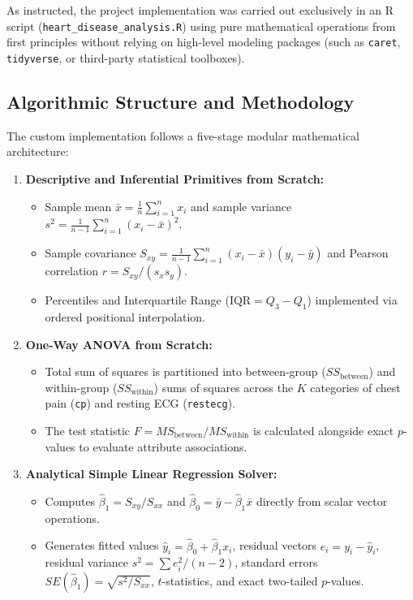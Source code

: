 \documentclass[12pt,a4paper]{article}
\begin{document}
As instructed, the project implementation was carried out exclusively in an R script (\texttt{heart\_disease\_analysis.R}) using pure mathematical operations from first principles without relying on high-level modeling packages (such as \texttt{caret}, \texttt{tidyverse}, or third-party statistical toolboxes).

\subsection{Algorithmic Structure and Methodology}
The custom implementation follows a five-stage modular mathematical architecture:

\begin{enumerate}
    \item \textbf{Descriptive and Inferential Primitives from Scratch:}
    \begin{itemize}
        \item Sample mean $\bar{x} = \frac{1}{n} \sum_{i=1}^n x_i$ and sample variance $s^2 = \frac{1}{n-1} \sum_{i=1}^n (x_i - \bar{x})^2$.
        \item Sample covariance $S_{xy} = \frac{1}{n-1} \sum_{i=1}^n (x_i - \bar{x})(y_i - \bar{y})$ and Pearson correlation $r = S_{xy} / (s_x s_y)$.
        \item Percentiles and Interquartile Range ($\text{IQR} = Q_3 - Q_1$) implemented via ordered positional interpolation.
    \end{itemize}

    \item \textbf{One-Way ANOVA from Scratch:}
    \begin{itemize}
        \item Total sum of squares is partitioned into between-group ($SS_{\text{between}}$) and within-group ($SS_{\text{within}}$) sums of squares across the $K$ categories of chest pain (\texttt{cp}) and resting ECG (\texttt{restecg}).
        \item The test statistic $F = MS_{\text{between}} / MS_{\text{within}}$ is calculated alongside exact $p$-values to evaluate attribute associations.
    \end{itemize}

    \item \textbf{Analytical Simple Linear Regression Solver:}
    \begin{itemize}
        \item Computes $\hat{\beta}_1 = S_{xy}/S_{xx}$ and $\hat{\beta}_0 = \bar{y} - \hat{\beta}_1 \bar{x}$ directly from scalar vector operations.
        \item Generates fitted values $\hat{y}_i = \hat{\beta}_0 + \hat{\beta}_1 x_i$, residual vectors $e_i = y_i - \hat{y}_i$, residual variance $s^2 = \sum e_i^2 / (n - 2)$, standard errors $SE(\hat{\beta}_1) = \sqrt{s^2 / S_{xx}}$, $t$-statistics, and exact two-tailed $p$-values.
    \end{itemize}


\end{enumerate}
\end{document}
